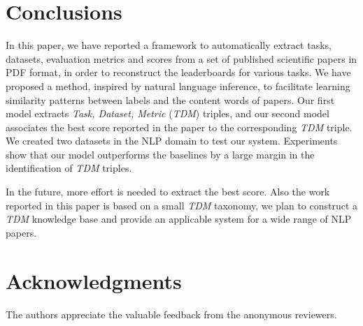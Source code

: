 \documentclass[11pt,a4paper]{article}
\begin{document}
\section{Conclusions}\label{sec:con}

In this paper, we have reported a framework to automatically extract tasks, datasets, evaluation metrics and scores from a set of published scientific  papers in PDF format, in order to reconstruct the leaderboards for various tasks.
We have proposed a method, inspired by natural language inference, to facilitate 
learning similarity patterns 
between labels and the content words of papers. Our first model extracts \emph{Task, Dataset, Metric} (\emph{TDM}) triples, and our second model associates the best score reported in the paper to the corresponding \emph{TDM} triple. 
We created two datasets in the NLP domain to test our system. 
Experiments show that our model outperforms the baselines by a large margin in  the identification of \emph{TDM} triples. 

In the future, more effort is needed to extract the best score. 
Also the work reported in this paper is based on a small \emph{TDM} taxonomy, we plan to construct a \emph{TDM} knowledge base and provide an applicable system for a wide range of NLP papers. 




\section*{Acknowledgments}
The authors appreciate the valuable feedback from the anonymous reviewers.





\end{document}
